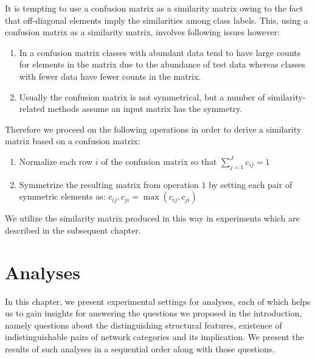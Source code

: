 \documentclass{article}
\begin{document}
It is tempting to use a confusion matrix as a similarity matrix owing to the fact that off-diagonal elements imply the similarities among class labels. This, using a confusion matrix as a similarity matrix, involves following issues however:
\begin{enumerate}
	\item In a confusion matrix classes with abundant data tend to have large counts for elements in the matrix due to the abundance of test data whereas classes with fewer data have fewer counts in the matrix.
	\item Usually the confusion matrix is not symmetrical, but a number of similarity-related methods assume an input matrix has the symmetry.
\end{enumerate}

Therefore we proceed on the following operations in order to derive a similarity matrix based on a confusion matrix:
\begin{enumerate}
	\item Normalize each row $i$ of the confusion matrix so that $\sum_{j=1}^J c_{ij} = 1$
	\item Symmetrize the resulting matrix from operation $1$ by setting each pair of symmetric elements as: $c_{ij},c_{ji} = \max (c_{ij},c_{ji})$
\end{enumerate}

We utilize the similarity matrix produced in this way in experiments which are described in the subsequent chapter.

\newpage	
\section{Analyses}
In this chapter, we present experimental settings for analyses, each of which helps us to gain insights for answering the questions we proposed in the introduction, namely questions about the distinguishing structural features, existence of indistinguishable pairs of network categories and its implication. We present the results of such analyses in a sequential order along with those questions. 
\end{document}
